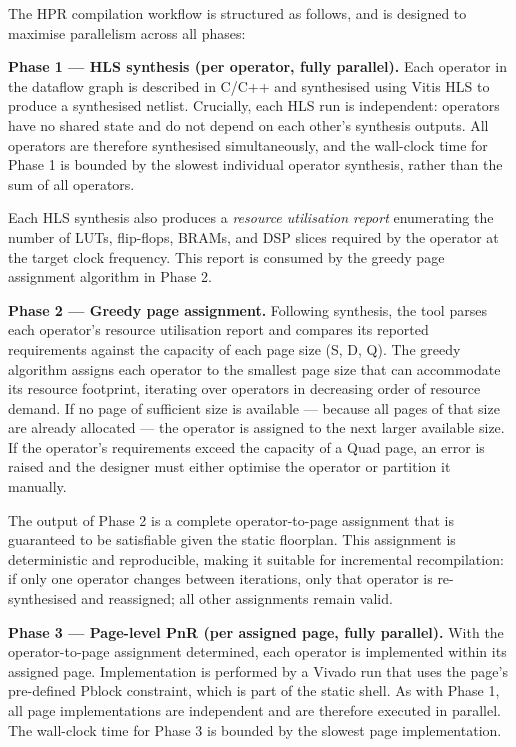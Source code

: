 The HPR compilation workflow is structured as follows, and is designed to maximise parallelism across all phases:

\textbf{Phase 1 — HLS synthesis (per operator, fully parallel).} Each operator in the dataflow graph is described in C/C++ and synthesised using Vitis HLS to produce a synthesised netlist. Crucially, each HLS run is independent: operators have no shared state and do not depend on each other's synthesis outputs. All operators are therefore synthesised simultaneously, and the wall-clock time for Phase 1 is bounded by the slowest individual operator synthesis, rather than the sum of all operators.

Each HLS synthesis also produces a \textit{resource utilisation report} enumerating the number of LUTs, flip-flops, BRAMs, and DSP slices required by the operator at the target clock frequency. This report is consumed by the greedy page assignment algorithm in Phase 2.

\textbf{Phase 2 — Greedy page assignment.} Following synthesis, the tool parses each operator's resource utilisation report and compares its reported requirements against the capacity of each page size (S, D, Q). The greedy algorithm assigns each operator to the smallest page size that can accommodate its resource footprint, iterating over operators in decreasing order of resource demand. If no page of sufficient size is available — because all pages of that size are already allocated — the operator is assigned to the next larger available size. If the operator's requirements exceed the capacity of a Quad page, an error is raised and the designer must either optimise the operator or partition it manually.

The output of Phase 2 is a complete operator-to-page assignment that is guaranteed to be satisfiable given the static floorplan. This assignment is deterministic and reproducible, making it suitable for incremental recompilation: if only one operator changes between iterations, only that operator is re-synthesised and reassigned; all other assignments remain valid.

\textbf{Phase 3 — Page-level PnR (per assigned page, fully parallel).} With the operator-to-page assignment determined, each operator is implemented within its assigned page. Implementation is performed by a Vivado run that uses the page's pre-defined Pblock constraint, which is part of the static shell. As with Phase 1, all page implementations are independent and are therefore executed in parallel. The wall-clock time for Phase 3 is bounded by the slowest page implementation.


